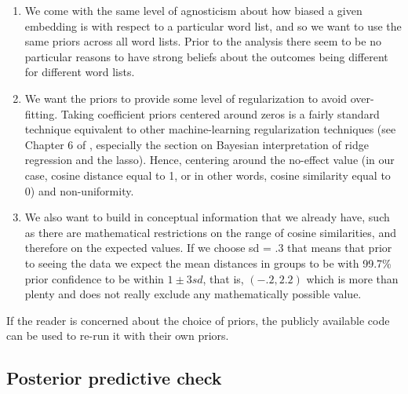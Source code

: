 \documentclass{clv3}
\begin{document}
\begin{enumerate}
	\item  We come with the same level of agnosticism about how biased a given embedding is with respect to a particular word list, and so we want to use 
	the same priors across all word lists. Prior to the analysis there seem to be no particular reasons to have strong beliefs about the outcomes being different for different word lists. 
	\item We want the priors to provide some level of regularization to avoid over-fitting. Taking coefficient priors centered around zeros is a fairly standard technique equivalent to other machine-learning regularization techniques (see Chapter 6 of \citep{james2013introduction}, especially the section on Bayesian interpretation of ridge regression and the lasso). Hence, centering around the no-effect value (in our case, cosine distance equal to 1, or in other words, cosine similarity equal to 0) and non-uniformity. 
	
	\item We also want to build in conceptual information that we already have, such as there are mathematical restrictions on the range of cosine similarities, and therefore on the expected values. If we choose sd = .3 that means that prior to seeing the data we expect the mean distances in groups to be with 99.7\% prior confidence to be within $1 \pm 3sd$, that is, $(-.2, 2.2)$ which is more than plenty and does not really exclude any mathematically possible value. 

\end{enumerate}

If the reader is concerned about the choice of priors, the publicly available code can be used  to re-run it with their own priors.


\hypertarget{posterior-predictive-check}{%
\subsection{Posterior predictive
check}\label{posterior-predictive-check}}

\label{subsec:posterior}
\end{document}
